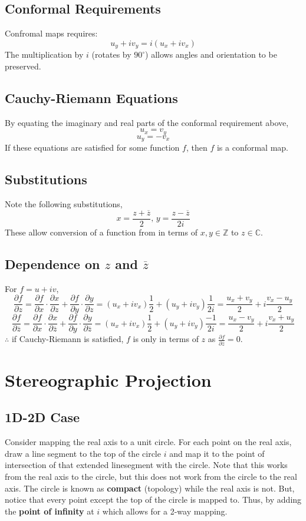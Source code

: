 \documentclass[../main.tex]{subfiles}
\begin{document}
\subsection{Conformal Requirements}
    Confromal maps requires:
        $$u_{y}+iv_{y}=i(u_{x}+iv_{x})$$
    The multiplication by $i$ (rotates by $90^{\circ}$) allows angles and orientation to be preserved.

\subsection{Cauchy-Riemann Equations}
    By equating the imaginary and real parts of the conformal requirement above,
    $$u_{x}=v_{y}$$
    $$u_{y}=-v_{x}$$
    If these equations are satisfied for some function $f$, then $f$ is a conformal map.

\subsection{Substitutions}
    Note the following substitutions,
    $$x=\frac{z+\overline{z}}{2}\text{, }y=\frac{z-\overline{z}}{2i}$$
    These allow conversion of a function from in terms of $x,y\in\mathbb{Z}$ to $z\in\mathbb{C}$.

\subsection{Dependence on $z$ and $\overline{z}$}
    For $f=u+iv$,
    $$\frac{\partial f}{\partial z}=\frac{\partial f}{\partial x}\cdot\frac{\partial x}{\partial z}+\frac{\partial f}{\partial y}\cdot\frac{\partial y}{\partial z}=(u_{x}+iv_{x})\frac{1}{2}+(u_{y}+iv_{y})\frac{1}{2i}=\frac{u_{x}+v_{y}}{2}+i\frac{v_{x}-u_{y}}{2}$$
    $$\frac{\partial f}{\partial \overline{z}}=\frac{\partial f}{\partial x}\cdot\frac{\partial x}{\partial \overline{z}}+\frac{\partial f}{\partial y}\cdot\frac{\partial y}{\partial \overline{z}}=(u_{x}+iv_{x})\frac{1}{2}+(u_{y}+iv_{y})\frac{-1}{2i}=\frac{u_{x}-v_{y}}{2}+i\frac{v_{x}+u_{y}}{2}$$
    $\therefore$ if Cauchy-Riemann is satisfied, $f$ is only in terms of $z$ as $\frac{\partial f}{\partial \overline{z}}=0$.


\section{Stereographic Projection}

\subsection{1D-2D Case}
    Consider mapping the real axis to a unit circle. For each point on the real axis, draw a line segment to the top of the circle $i$ and map it to the point of intersection of that extended linesegment with the circle.
    Note that this works from the real axis to the circle, but this does not work from the circle to the real axis.
    The circle is known as \textbf{compact} (topology) while the real axis is not.
    But, notice that every point except the top of the circle is mapped to. Thus, by adding the \textbf{point of infinity} at $i$ which allows for a 2-way mapping.
\end{document}
